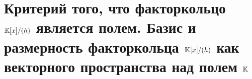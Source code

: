 \section{Критерий того, что факторкольцо $\mathbb{K}[x]/(h)$ является полем. Базис и размерность факторкольца $\mathbb{K}[x]/(h)$ как векторного пространства над полем $\mathbb{K}$}